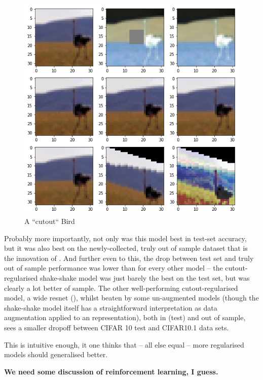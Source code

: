 \documentclass[10pt,twocolumn,letterpaper]{article}
\begin{document}
\begin{figure}[t]
\begin{center}
   \includegraphics[trim={6.5cm 12.5cm 6.5cm 0}, clip, width=0.8\linewidth]{image.png}
\end{center}
   \caption{A ``cutout`` Bird}
\label{fig:cutout}
\end{figure}


Probably more importantly, not only was this model best in test-set accuracy, but it was also best on the newly-collected, truly out of sample dataset that is the innovation of \cite{Recht2018}. And further even to this, the drop between test set and truly out of sample performance was lower than for every other model -- the cutout-regularised shake-shake model was just barely the best on the test set, but was clearly a lot better of sample. The other well-performing cutout-regularised model, a wide resnet (\cite{Zagoruyko2016}), whilst beaten by some un-augmented models (though the shake-shake model itself has a straightforward interpretation as data augmentation applied to an representation), both in (test) and out of sample, sees a smaller dropoff between CIFAR 10 test and CIFAR10.1 data sets. 

This is intuitive enough, it one thinks that -- all else equal -- more regularised models should generalised better. 

\textbf{We need some discussion of reinforcement learning, I guess.}
\end{document}
